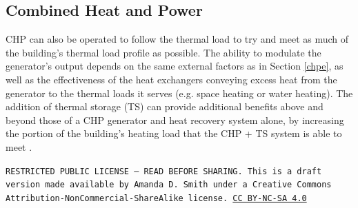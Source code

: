 \documentclass[10pt]{article}
\begin{document}
\subsection{Combined Heat and Power}
\label{chph}

CHP can also be operated to follow the thermal load to try and meet as much of the building's thermal load profile as possible. The ability to modulate the generator's output depends on the same external factors as in Section \ref{chpe}, as well as the effectiveness of the heat exchangers conveying excess heat from the generator to the thermal loads it serves (e.g. space heating or water heating). The addition of thermal storage (TS) can provide additional benefits above and beyond those of a CHP generator and heat recovery system alone, by increasing the portion of the building's heating load that the CHP + TS system is able to meet \cite{Smith2013-xo}.

\bigskip

\noindent
\texttt{\footnotesize RESTRICTED PUBLIC LICENSE --- READ BEFORE SHARING. This is a draft version made available by Amanda D. Smith under a Creative Commons Attribution-NonCommercial-ShareAlike license. 
\href{https://creativecommons.org/licenses/by-nc-sa/4.0/}{CC BY-NC-SA 4.0}}

\newpage
\printbibliography
\end{document}
